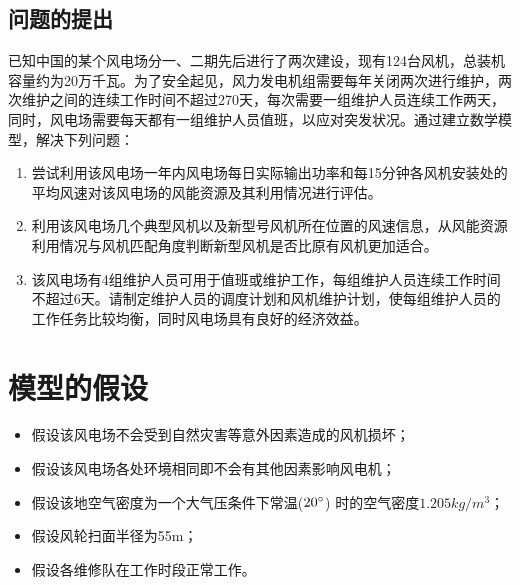 \documentclass[withoutpreface,bwprint]{cumcmthesis} %
\begin{document}
	\subsection{问题的提出}
	已知中国的某个风电场分一、二期先后进行了两次建设，现有124台风机，总装机容量约为20万千瓦。为了安全起见，风力发电机组需要每年关闭两次进行维护，两次维护之间的连续工作时间不超过270天，每次需要一组维护人员连续工作两天，同时，风电场需要每天都有一组维护人员值班，以应对突发状况。通过建立数学模型，解决下列问题：\par
	\begin{enumerate}[itemsep=0pt,parsep=0pt,label=(\arabic*)]
	\item 尝试利用该风电场一年内风电场每日实际输出功率和每15分钟各风机安装处的平均风速对该风电场的风能资源及其利用情况进行评估。
	\item 利用该风电场几个典型风机以及新型号风机所在位置的风速信息，从风能资源利用情况与风机匹配角度判断新型风机是否比原有风机更加适合。
	\item 该风电场有4组维护人员可用于值班或维护工作，每组维护人员连续工作时间不超过6天。请制定维护人员的调度计划和风机维护计划，使每组维护人员的工作任务比较均衡，同时风电场具有良好的经济效益。
	
	\end{enumerate}
	
	
	\section{模型的假设}
	\begin{itemize}
	\item 假设该风电场不会受到自然灾害等意外因素造成的风机损坏；
	\item 假设该风电场各处环境相同即不会有其他因素影响风电机；
	\item 假设该地空气密度为一个大气压条件下常温($20\degree$) 时的空气密度$1.205kg/m^3$；
	\item 假设风轮扫面半径为55m；
	\item 假设各维修队在工作时段正常工作。
	\end{itemize}\par	
	\newpage
\end{document}
